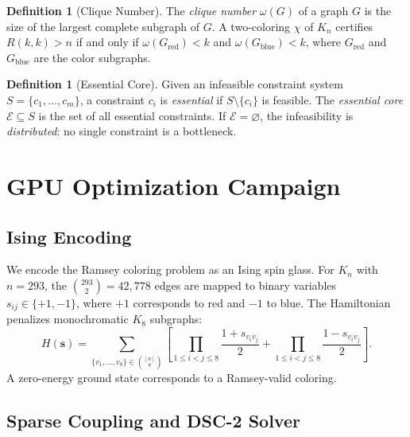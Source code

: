 \documentclass[12pt,a4paper]{article}
\theoremstyle{definition}
\newtheorem{definition}[theorem]{Definition}
\theoremstyle{remark}
\newcommand{\Ramsey}[2]{R(#1,#2)}
\newcommand{\Kn}[1]{K_{#1}}
\begin{document}
\begin{definition}[Clique Number]
The \emph{clique number} $\omega(G)$ of a graph $G$ is the size of the largest complete subgraph of $G$.  A two-coloring $\chi$ of $\Kn{n}$ certifies $\Ramsey{k}{k} > n$ if and only if $\omega(G_{\text{red}}) < k$ and $\omega(G_{\text{blue}}) < k$, where $G_{\text{red}}$ and $G_{\text{blue}}$ are the color subgraphs.
\end{definition}

\begin{definition}[Essential Core]
\label{def:essential}
Given an infeasible constraint system $S = \{c_1, \ldots, c_m\}$, a constraint $c_i$ is \emph{essential} if $S \setminus \{c_i\}$ is feasible.  The \emph{essential core} $\mathcal{E} \subseteq S$ is the set of all essential constraints.  If $\mathcal{E} = \varnothing$, the infeasibility is \emph{distributed}: no single constraint is a bottleneck.
\end{definition}

\section{GPU Optimization Campaign}
\label{sec:gpu}

\subsection{Ising Encoding}

We encode the Ramsey coloring problem as an Ising spin glass.  For $\Kn{n}$ with $n = 293$, the $\binom{293}{2} = 42{,}778$ edges are mapped to binary variables $s_{ij} \in \{+1, -1\}$, where $+1$ corresponds to red and $-1$ to blue.  The Hamiltonian penalizes monochromatic $K_8$ subgraphs:
\begin{equation}
\label{eq:ising}
H(\mathbf{s}) = \sum_{\{v_1, \ldots, v_8\} \in \binom{[n]}{8}} \left[ \prod_{1 \le i < j \le 8} \frac{1 + s_{v_i v_j}}{2} + \prod_{1 \le i < j \le 8} \frac{1 - s_{v_i v_j}}{2} \right].
\end{equation}
A zero-energy ground state corresponds to a Ramsey-valid coloring.

\subsection{Sparse Coupling and DSC-2 Solver}
\end{document}
